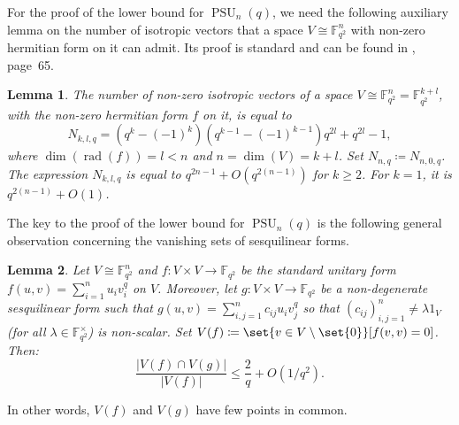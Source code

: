 \documentclass[a4paper,11pt]{amsproc}
\newcommand{\card}[1]{\left\lvert#1\right\rvert}%
\newcommand{\finfield}{\mathbb{F}}%
\DeclareMathOperator{\PSU}{PSU}%
\DeclareMathOperator{\rad}{rad}%
\theoremstyle{plain}
\newtheorem{lemma}{Lemma}[section]
\theoremstyle{definition}
\begin{document}
	For the proof of the lower bound for $\PSU_n(q)$, we need the following auxiliary lemma on the number of isotropic vectors that a space $V\cong\finfield_{q^2}^n$ with non-zero hermitian form on it can admit. Its proof is standard and can be found in \cite{wilson2009finite}, page~65.
	
	\begin{lemma}\label{lem:num_isotrpc_vects}
		The number of non-zero isotropic vectors of a space $V\cong\finfield_{q^2}^n=\finfield_{q^2}^{k+l}$, with the non-zero hermitian form $f$ on it, is equal to
		$$
		N_{k,l,q}=(q^k-(-1)^k)(q^{k-1}-(-1)^{k-1})q^{2l}+q^{2l}-1,
		$$
		where $\dim(\rad(f))=l<n$ and $n=\dim(V)=k+l$. Set $N_{n,q}\coloneqq N_{n,0,q}$. The expression $N_{k,l,q}$ is equal to $q^{2n-1}+O(q^{2(n-1)})$ for $k\geq 2$. For $k=1$, it is $q^{2(n-1)}+O(1)$.
	\end{lemma}
	
	The key to the proof of the lower bound for $\PSU_n(q)$ is the following general observation concerning the vanishing sets of sesquilinear forms. 
	
	\begin{lemma}
		Let $V\cong\finfield_{q^2}^n$ and $f\colon V\times V\to\finfield_{q^2}$ be the standard unitary form $f(u,v)=\sum_{i=1}^n{u_i v_i^q}$ on $V$. Moreover, let $g\colon V\times V\to\finfield_{q^2}$ be a non-degenerate sesquilinear form such that $g(u,v)=\sum_{i,j=1}^n{c_{ij}u_i v_j^q}$ so that $(c_{ij})_{i,j=1}^n\neq \lambda 1_V$ (for all $\lambda\in\finfield_{q^2}^\times$) is non-scalar. Set $V(f)\coloneqq\set{v\in V\setminus\set{0}}[f(v,v)=0]$. Then:
		$$
		\frac{\card{V(f)\cap V(g)}}{\card{V(f)}}\leq\frac{2}{q}+O(1/q^2).
		$$
	\end{lemma}
	
	In other words, $V(f)$ and $V(g)$ have few points in common.
	
\end{document}

